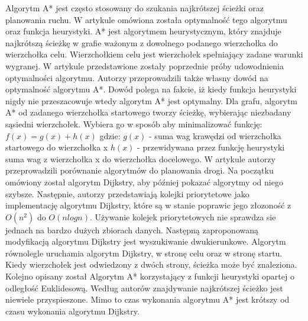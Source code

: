 \indent
Algorytm A* jest często stosowany do szukania najkrótszej ścieżki oraz planowania ruchu. W artykule \cite{dechter1985generalized} omówiona została optymalność tego algorytmu oraz funkcja heurystyki. A* jest algorytmem heurystycznym, który znajduje najkrótszą ścieżkę w grafie ważonym z dowolnego podanego wierzchołka do wierzchołka celu. Wierzchołkiem celu jest wierzchołek spełniający zadane warunki wygranej. W artykule przedstawione zostały poprzednie próby udowodnienia optymalności algorytmu. Autorzy przeprowadzili także własny dowód na optymalność algorytmu A*. Dowód polega na fakcie, iż kiedy funkcja heurystyki nigdy nie przeszacowuje wtedy algorytm A* jest optymalny. Dla grafu, algorytm A* od zadanego wierzchołka startowego tworzy ścieżkę, wybierając niezbadany sąsiedni wierzchołek. Wybiera go w sposób aby minimalizować funkcję:
\newline
\newline
\begin{math} f(x) = g(x) + h(x)\end{math}
\newline
\newline
gdzie:
\newline
\newline
\begin{math} g(x) \end{math} - suma wag krawędzi od wierzchołka startowego do wierzchołka x
\begin{math} h(x) \end{math} - przewidywana przez funkcję heurystyki suma wag z wierzchołka x do wierzchołka docelowego.
\newline
\indent
W artykule \cite{delling2009engineering} autorzy przeprowadzili porównanie algorytmów do planowania drogi. Na początku omówiony został algorytm Dijkstry, aby później pokazać algorytmy od niego szybsze. Następnie, autorzy przedstawiają kolejki priorytetowe jako implementację algorytmu Dijkstry, które są w stanie poprawic jego złozoność z \begin{math} O(n^2) \end{math} do \begin{math} O(nlogn) \end{math}. Używanie kolejek priorytetowych nie sprawdza sie jednach na bardzo dużych zbiorach danych. Następną zaproponowaną modyfikacją algorytmu Dijkstry jest wyszukiwanie dwukierunkowe. Algorytm równolegle uruchamia algorytm Dijkstry, w stronę celu oraz w stronę startu. Kiedy wierzchołek jest odwiedzony z dwóch strony, ścieżka może być znaleziona. Kolejno opisany został Algorytm A* korzystający z funkcji heurystyki opartej o odległość Euklidesową. Według autorów znajdywanie najkrótszej ścieżko jest niewiele przyspieszone. Mimo to czas wykonania algorytmu A* jest krótszy od czasu wykonania algorytmu Dijkstry.
